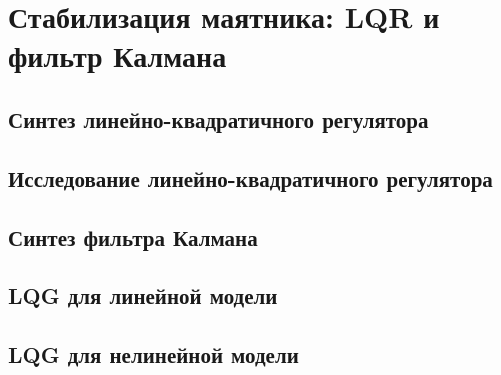\chapter{Стабилизация маятника: LQR и фильтр Калмана}
\label{ch:chap6}

\section{Синтез линейно-квадратичного регулятора}


\section{Исследование линейно-квадратичного регулятора}

\section{Синтез фильтра Калмана}


\section{LQG для линейной модели}


\section{LQG для нелинейной модели}


\endinput